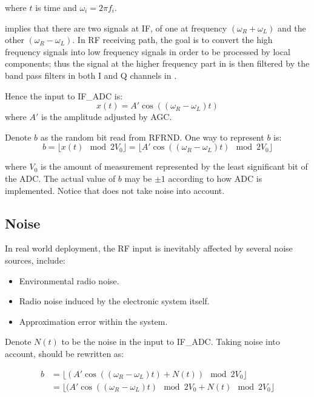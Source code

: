 where $t$ is time and $\omega_i = 2{\pi}f_i$.

 implies that there are two signals at IF, of one at frequency $(\omega_{R} + \omega_{L})$ and the other $(\omega_{R} - \omega_{L})$. In RF receiving path, the goal is to convert the high frequency signals into low frequency signals in order to be processed by local components; thus the signal at the higher frequency part in  is then filtered by the band pass filters in both I and Q channels in . 

Hence the input to IF\_ADC is:
\begin{equation}
x(t) = A'\cos((\omega_{R} - \omega_{L})t)
\end{equation}
where $A'$ is the amplitude adjusted by AGC. 

Denote $b$ as the random bit read from RFRND. One way to represent $b$ is:
\begin{equation} \label{RFRND}
b = \lfloor{x(t)} \mod 2V_0 \rfloor = \lfloor{A'\cos((\omega_{R} - \omega_{L})t) \mod 2V_0 }\rfloor
\end{equation}

where $V_0$ is the amount of measurement represented by the least significant bit of the ADC. The actual value of $b$ may be $\pm 1$ according to how ADC is implemented. Notice that  does not take noise into account.

\subsection{Noise}

In real world deployment, the RF input is inevitably affected by several noise sources, include:

\begin{itemize}
\item Environmental radio noise.
\item Radio noise induced by the electronic system itself.
\item Approximation error within the system.
\end{itemize}

Denote $N(t)$ to be the noise in the input to IF\_ADC. Taking noise into account,  should be rewritten as:

\begin{equation} \label{RFRND_noise}
\begin{split}
b &= \lfloor{(A'\cos((\omega_{R} - \omega_{L})t) + N(t) )\mod 2V_0 }\rfloor \\
&= \lfloor{(A'\cos((\omega_{R} - \omega_{L})t) \mod 2V_0 + N(t) \mod 2V_0 }\rfloor
\end{split}
\end{equation}

